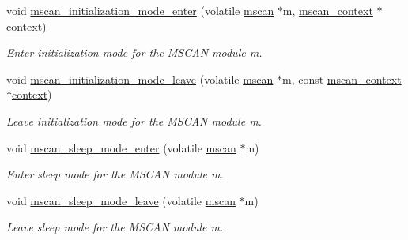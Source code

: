 \begin{DoxyCompactItemize}
void \mbox{\hyperlink{group__RTEMSBSPsPowerPCGen5200MSCAN_ga587e0d7b0c1d090fda013c551f02a3f7}{mscan\+\_\+initialization\+\_\+mode\+\_\+enter}} (volatile \mbox{\hyperlink{group__RTEMSBSPsPowerPCGen5200MSCAN_gacfd56a4a482c5e7da2cff003284b2d51}{mscan}} $\ast$m, \mbox{\hyperlink{structmscan__context}{mscan\+\_\+context}} $\ast$\mbox{\hyperlink{sun4u_2tte_8h_a9b4a99475e2709333b8e5d70483173f1}{context}})
\begin{DoxyCompactList}\small\item\em Enter initialization mode for the M\+S\+C\+AN module {\itshape m}. \end{DoxyCompactList}\item 
void \mbox{\hyperlink{group__RTEMSBSPsPowerPCGen5200MSCAN_ga29478727b755ce8d81ded34969194a1b}{mscan\+\_\+initialization\+\_\+mode\+\_\+leave}} (volatile \mbox{\hyperlink{group__RTEMSBSPsPowerPCGen5200MSCAN_gacfd56a4a482c5e7da2cff003284b2d51}{mscan}} $\ast$m, const \mbox{\hyperlink{structmscan__context}{mscan\+\_\+context}} $\ast$\mbox{\hyperlink{sun4u_2tte_8h_a9b4a99475e2709333b8e5d70483173f1}{context}})
\begin{DoxyCompactList}\small\item\em Leave initialization mode for the M\+S\+C\+AN module {\itshape m}. \end{DoxyCompactList}\item 
\mbox{\label{group__RTEMSBSPsPowerPCGen5200MSCAN_gad83ce6a322af397faaf49fa15e2b5796}} 
void \mbox{\hyperlink{group__RTEMSBSPsPowerPCGen5200MSCAN_gad83ce6a322af397faaf49fa15e2b5796}{mscan\+\_\+sleep\+\_\+mode\+\_\+enter}} (volatile \mbox{\hyperlink{group__RTEMSBSPsPowerPCGen5200MSCAN_gacfd56a4a482c5e7da2cff003284b2d51}{mscan}} $\ast$m)
\begin{DoxyCompactList}\small\item\em Enter sleep mode for the M\+S\+C\+AN module {\itshape m}. \end{DoxyCompactList}\item 
\mbox{\label{group__RTEMSBSPsPowerPCGen5200MSCAN_ga189ba2bd33b05769166ff5c105af3395}} 
void \mbox{\hyperlink{group__RTEMSBSPsPowerPCGen5200MSCAN_ga189ba2bd33b05769166ff5c105af3395}{mscan\+\_\+sleep\+\_\+mode\+\_\+leave}} (volatile \mbox{\hyperlink{group__RTEMSBSPsPowerPCGen5200MSCAN_gacfd56a4a482c5e7da2cff003284b2d51}{mscan}} $\ast$m)
\begin{DoxyCompactList}\small\item\em Leave sleep mode for the M\+S\+C\+AN module {\itshape m}. \end{DoxyCompactList}\item 

\end{DoxyCompactItemize}
